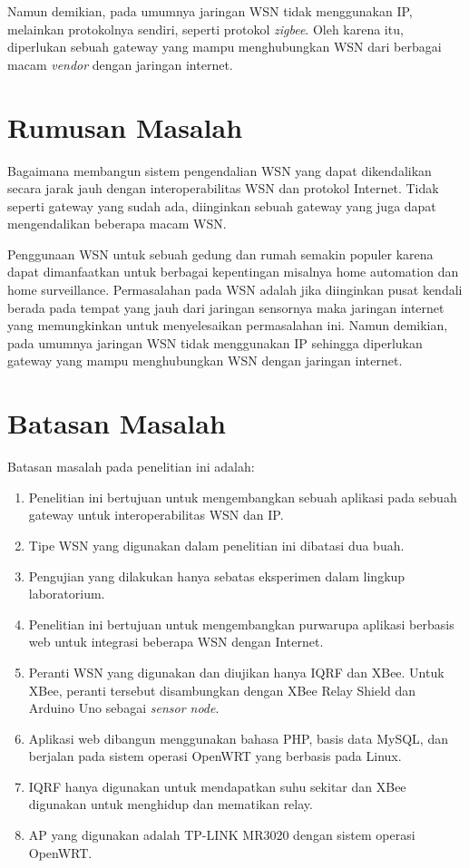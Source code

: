 Namun demikian, pada umumnya jaringan WSN tidak menggunakan IP, melainkan protokolnya sendiri, seperti protokol \emph{zigbee}. Oleh karena itu, diperlukan sebuah gateway yang mampu menghubungkan WSN dari berbagai macam \emph{vendor} dengan jaringan internet.


\section{Rumusan Masalah}
Bagaimana membangun sistem pengendalian WSN yang dapat dikendalikan secara jarak jauh dengan interoperabilitas WSN dan protokol Internet. Tidak seperti gateway yang sudah ada, diinginkan sebuah gateway yang juga dapat mengendalikan beberapa macam WSN.

Penggunaan WSN untuk sebuah gedung dan rumah semakin populer karena dapat dimanfaatkan untuk berbagai kepentingan misalnya home automation dan home surveillance. Permasalahan pada WSN adalah jika diinginkan pusat kendali berada pada tempat yang jauh dari jaringan sensornya maka jaringan internet yang memungkinkan untuk menyelesaikan permasalahan ini. Namun demikian, pada umumnya jaringan WSN tidak menggunakan IP sehingga diperlukan gateway yang mampu menghubungkan WSN dengan jaringan internet.


\section{Batasan Masalah}
Batasan masalah pada penelitian ini adalah:
\begin{enumerate}
\item Penelitian ini bertujuan untuk mengembangkan sebuah aplikasi pada sebuah gateway untuk interoperabilitas WSN dan IP.
\item Tipe WSN yang digunakan dalam penelitian ini dibatasi dua buah.
\item Pengujian yang dilakukan hanya sebatas eksperimen dalam lingkup laboratorium.

\item Penelitian ini bertujuan untuk mengembangkan purwarupa aplikasi berbasis web untuk integrasi beberapa WSN dengan Internet.
\item Peranti WSN yang digunakan dan diujikan hanya IQRF dan XBee. Untuk XBee, peranti tersebut disambungkan dengan XBee Relay Shield dan Arduino Uno sebagai \emph{sensor node}.
\item Aplikasi web dibangun menggunakan bahasa PHP, basis data MySQL, dan berjalan pada sistem operasi OpenWRT yang berbasis pada Linux.
\item IQRF hanya digunakan untuk mendapatkan suhu sekitar dan XBee digunakan untuk menghidup dan mematikan relay.
\item AP yang digunakan adalah TP-LINK MR3020 dengan sistem operasi OpenWRT.
\end{enumerate}


